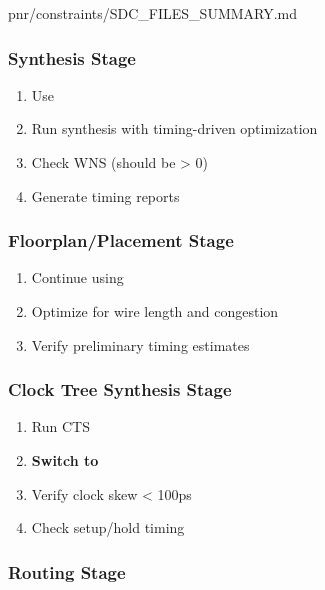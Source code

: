 \begin{relocated}{pnr/constraints/SDC_FILES_SUMMARY.md}
\subsubsection{Synthesis Stage}\label{tm:pd:constraints-sdc-files-summary:synthesis-stage}

\begin{enumerate}
\def\labelenumi{\arabic{enumi}.}
\tightlist
\item
  Use 
\item
  Run synthesis with timing-driven optimization
\item
  Check WNS (should be \textgreater{} 0)
\item
  Generate timing reports
\end{enumerate}

\subsubsection{\texorpdfstring{Floorplan/\allowbreak{}Placement
Stage}{Floorplan/Placement Stage}}\label{tm:pd:constraints-sdc-files-summary:floorplanplacement-stage}

\begin{enumerate}
\def\labelenumi{\arabic{enumi}.}
\tightlist
\item
  Continue using 
\item
  Optimize for wire length and congestion
\item
  Verify preliminary timing estimates
\end{enumerate}

\subsubsection{Clock Tree Synthesis Stage}\label{tm:pd:constraints-sdc-files-summary:clock-tree-synthesis-stage}

\begin{enumerate}
\def\labelenumi{\arabic{enumi}.}
\tightlist
\item
  Run CTS
\item
  \textbf{Switch to} 
\item
  Verify clock skew \textless{} 100ps
\item
  Check setup/\allowbreak{}hold timing
\end{enumerate}

\subsubsection{Routing Stage}\label{tm:pd:constraints-sdc-files-summary:routing-stage}


\end{relocated}
